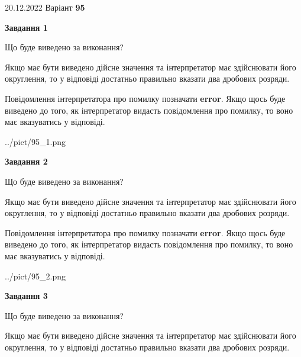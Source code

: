 \documentclass[12pt, ukrainian]{article}
\begin{document}
{20.12.2022 Варіант \No \textbf { 95 }\par}
{
\begin {Large}

{\begin {center}\textbf{Завдання 1}\end {center}}\par
Що буде виведено за виконання? \par

Якщо має бути виведено дійсне значення та інтерпретатор має здійснювати його округлення, 
то у відповіді достатньо правильно вказати два дробових розряди.

Повідомлення інтерпретатора про помилку позначати \textbf{error}.
Якщо щось буде виведено до того, як інтерпретатор видасть повідомлення про помилку, 
то воно має вказуватись у відповіді. \par

\begin{center}
	{../pict/95_1.png}
\end{center}
\newpage

{\begin {center}\textbf{Завдання 2}\end {center}}\par
Що буде виведено за виконання? \par

Якщо має бути виведено дійсне значення та інтерпретатор має здійснювати його округлення, 
то у відповіді достатньо правильно вказати два дробових розряди.

Повідомлення інтерпретатора про помилку позначати \textbf{error}.
Якщо щось буде виведено до того, як інтерпретатор видасть повідомлення про помилку, 
то воно має вказуватись у відповіді. \par

\begin{center}
	{../pict/95_2.png}
\end{center}
\newpage

{\begin {center}\textbf{Завдання 3}\end {center}}\par
Що буде виведено за виконання? \par

Якщо має бути виведено дійсне значення та інтерпретатор має здійснювати його округлення, 
то у відповіді достатньо правильно вказати два дробових розряди.


\end{Large}}
\end{document}
